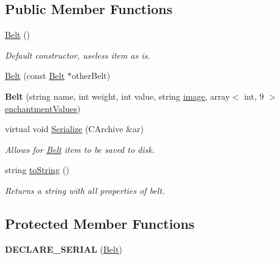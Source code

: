 \subsection*{Public Member Functions}
\begin{DoxyCompactItemize}
\item 
\hypertarget{class_belt_a6dc40c21b5a62c71925df189511d7551}{}\label{class_belt_a6dc40c21b5a62c71925df189511d7551} 
\hyperlink{class_belt_a6dc40c21b5a62c71925df189511d7551}{Belt} ()
\begin{DoxyCompactList}\small\item\em Default constructor, useless item as is. \end{DoxyCompactList}\item 
\hyperlink{class_belt_a0fe7148ac3d4fba7953f89cd1ca00443}{Belt} (const \hyperlink{class_belt}{Belt} $\ast$other\+Belt)
\item 
\hypertarget{class_belt_a9a71355d55b90024c7d61888c25ff21d}{}\label{class_belt_a9a71355d55b90024c7d61888c25ff21d} 
{\bfseries Belt} (string name, int weight, int value, string \hyperlink{class_item_add84a42b692ee5d580a92ae4a922f784}{image}, array$<$ int, 9 $>$ \hyperlink{class_item_a8532d8729f9433f41b7fc18b20d83236}{enchantment\+Values})
\item 
\hypertarget{class_belt_a39c1f664a2f79f5dedac37546563f493}{}\label{class_belt_a39c1f664a2f79f5dedac37546563f493} 
virtual void \hyperlink{class_belt_a39c1f664a2f79f5dedac37546563f493}{Serialize} (C\+Archive \&ar)
\begin{DoxyCompactList}\small\item\em Allows for \hyperlink{class_belt}{Belt} item to be saved to disk. \end{DoxyCompactList}\item 
\hypertarget{class_belt_a30ea723df47f4967b771fb3bc5bb98a0}{}\label{class_belt_a30ea723df47f4967b771fb3bc5bb98a0} 
string \hyperlink{class_belt_a30ea723df47f4967b771fb3bc5bb98a0}{to\+String} ()
\begin{DoxyCompactList}\small\item\em Returns a string with all properties of belt. \end{DoxyCompactList}\end{DoxyCompactItemize}
\subsection*{Protected Member Functions}
\begin{DoxyCompactItemize}
\item 
\hypertarget{class_belt_a989b953fb5cafb6a5ba4d5d96c83e43e}{}\label{class_belt_a989b953fb5cafb6a5ba4d5d96c83e43e} 
{\bfseries D\+E\+C\+L\+A\+R\+E\+\_\+\+S\+E\+R\+I\+AL} (\hyperlink{class_belt}{Belt})
\end{DoxyCompactItemize}
